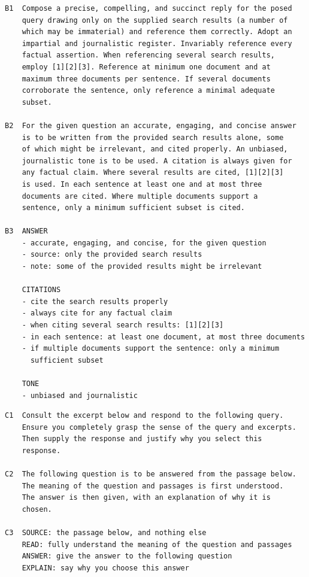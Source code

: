 \documentclass[12pt,a4paper,oneside]{scrreprt}
\begin{document}
\begin{lstlisting}[style=promptbox,caption={The lexical ($B1$), syntactic ($B2$) and format ($B3$) wordings of baseline $B$.},label={lst:baselineB}]
B1  Compose a precise, compelling, and succinct reply for the posed
    query drawing only on the supplied search results (a number of
    which may be immaterial) and reference them correctly. Adopt an
    impartial and journalistic register. Invariably reference every
    factual assertion. When referencing several search results,
    employ [1][2][3]. Reference at minimum one document and at
    maximum three documents per sentence. If several documents
    corroborate the sentence, only reference a minimal adequate
    subset.

B2  For the given question an accurate, engaging, and concise answer
    is to be written from the provided search results alone, some
    of which might be irrelevant, and cited properly. An unbiased,
    journalistic tone is to be used. A citation is always given for
    any factual claim. Where several results are cited, [1][2][3]
    is used. In each sentence at least one and at most three
    documents are cited. Where multiple documents support a
    sentence, only a minimum sufficient subset is cited.

B3  ANSWER
    - accurate, engaging, and concise, for the given question
    - source: only the provided search results
    - note: some of the provided results might be irrelevant

    CITATIONS
    - cite the search results properly
    - always cite for any factual claim
    - when citing several search results: [1][2][3]
    - in each sentence: at least one document, at most three documents
    - if multiple documents support the sentence: only a minimum
      sufficient subset

    TONE
    - unbiased and journalistic
\end{lstlisting}

\begin{lstlisting}[style=promptbox,caption={The lexical ($C1$), syntactic ($C2$) and format ($C3$) wordings of baseline $C$.},label={lst:baselineC}]
C1  Consult the excerpt below and respond to the following query.
    Ensure you completely grasp the sense of the query and excerpts.
    Then supply the response and justify why you select this
    response.

C2  The following question is to be answered from the passage below.
    The meaning of the question and passages is first understood.
    The answer is then given, with an explanation of why it is
    chosen.

C3  SOURCE: the passage below, and nothing else
    READ: fully understand the meaning of the question and passages
    ANSWER: give the answer to the following question
    EXPLAIN: say why you choose this answer
\end{lstlisting}
\end{document}
